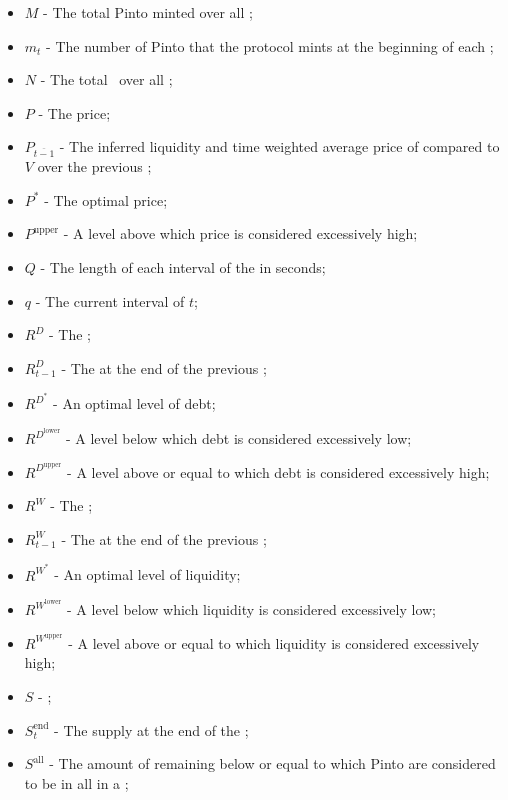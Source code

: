 \documentclass[class=article, crop=false]{standalone}
\begin{document}
\begin{itemize}[topsep=0pt, itemsep=3pt,leftmargin=16pt]
    \item[] $M$ - The total Pinto minted over all ;
    \item[] $m_{t}$ - The number of Pinto that the protocol mints at the beginning of each ;
    \item[] $N$ - The total  \Pinto\ over all ;
    \item[] $P$ - The price;
    \item[] $P_{\overline{t-1}}$ - The inferred liquidity and time weighted average price of  compared to $V$ over the previous ;
    \item[] $P^{*}$ - The optimal price;
    \item[] $P^{\text{upper}}$ - A level above which price is considered excessively high;
    \item[] $Q$ - The length of each interval of the  in seconds; 
    \item[] $q$ - The current interval of $t$;
    \item[] $R^{D}$ - The ;
    \item[] $R_{t-1}^{D}$ - The  at the end of the previous ;
    \item[] $R^{D^{*}}$ - An optimal level of debt;
    \item[] $R^{D^{\text{lower}}}$ - A level below which debt is considered excessively low;
    \item[] $R^{D^{\text{upper}}}$ - A level above or equal to which debt is considered excessively high;
    \item[] $R^{W}$ - The ;
    \item[] $R_{t-1}^{W}$ - The  at the end of the previous ;
    \item[] $R^{W^{*}}$ - An optimal level of liquidity;
    \item[] $R^{W^{\text{lower}}}$ - A level below which liquidity is considered excessively low;
    \item[] $R^{W^{\text{upper}}}$ - A level above or equal to which liquidity is considered excessively high;
    \item[] $S$ - ;
    \item[] $S_{t}^{\text{end}}$ - The  supply at the end of the ;
    \item[] $S^{\text{all}}$ - The amount of remaining  below or equal to which Pinto are considered to be  in all  in a ;

\end{itemize}
\end{document}
